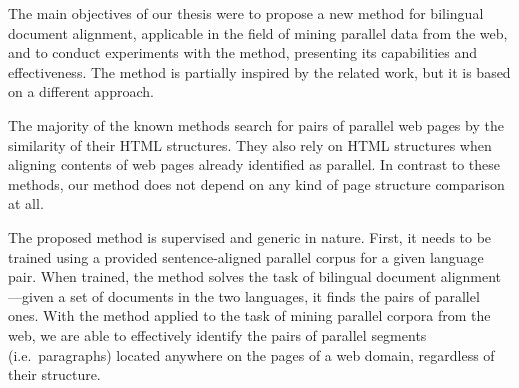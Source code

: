 

The main objectives of our thesis were to propose a new method for bilingual document alignment, applicable in the field of mining parallel data from the web, and to conduct experiments with the method, presenting its capabilities and effectiveness. The method is partially inspired by the related work, but it is based on a different approach.

The majority of the known methods search for pairs of parallel web pages by the similarity of their HTML structures. They also rely on HTML structures when aligning contents of web pages already identified as parallel. In contrast to these methods, our method does not depend on any kind of page structure comparison at all. 

The proposed method is supervised and generic in nature. First, it needs to be trained using a provided sentence-aligned parallel corpus for a given language pair. When trained, the method solves the task of bilingual document alignment---given a set of documents in the two languages, it finds the pairs of parallel ones. With the method applied to the task of mining parallel corpora from the web, we are able to effectively identify the pairs of parallel segments (i.e.\ paragraphs) located anywhere on the pages of a web domain, regardless of their structure. 

